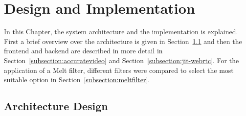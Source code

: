 \documentclass[../MasterThesis.tex]{subfiles}
\begin{document}
	
	
	
%
%
%
%
%
%
%
%
\newpage
\section{Design and Implementation} \label{section:designandimplementation}

In this Chapter, the system architecture and the implementation is explained. First a brief overview over the architecture is given in Section~\ref{subsection:architecturedesign} and then the frontend and backend are described in more detail in Section~\ref{subsection:accuratevideo} and Section~\ref{subsection:jit-webrtc}.
For the application of a Melt filter, different filters were compared to select the most suitable option in Section~\ref{subsection:meltfilter}.





\subsection{Architecture Design} \label{subsection:architecturedesign}

\end{document}
